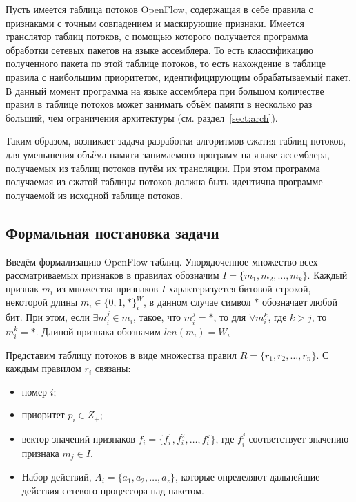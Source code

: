 \documentclass[oneside,final,12pt]{extarticle}
\begin{document}
    Пусть имеется таблица потоков OpenFlow, содержащая в себе правила с признаками с 
    точным совпадением и маскирующие признаки. Имеется транслятор таблиц потоков, с помощью которого
    получается программа обработки сетевых пакетов на языке ассемблера. То есть классификацию 
    полученного пакета по этой таблице потоков, то есть нахождение в таблице правила 
    с наибольшим приоритетом, идентифицирующим обрабатываемый пакет. В данный момент
    программа на языке ассемблера при большом количестве правил в таблице потоков может занимать
    объём памяти в несколько раз больший, чем ограничения архитектуры (см. раздел~\ref{sect:arch}).

    Таким образом, возникает задача разработки алгоритмов сжатия таблиц потоков,
    для уменьшения объёма памяти занимаемого программ на языке ассемблера, получаемых из
    таблиц потоков путём их трансляции. При этом программа получаемая из сжатой таблицы потоков 
    должна быть идентична программе получаемой из исходной таблице потоков.

    
    \subsection{Формальная постановка задачи}
        \label{sect:problem}
        Введём формализацию OpenFlow таблиц.
        Упорядоченное множество всех рассматриваемых признаков в правилах обозначим \(I=\{m_1,m_2,\ldots,m_k\}\). 
        Каждый признак \(m_i\) из множества признаков \(I\) характеризуется битовой строкой, некоторой длины \(m_i \in \{0, 1, *\}^W_i\),
        в данном случае символ \(*\) обозначает любой бит. При этом, если \(\exists m_i^j \in m_i\), такое, что 
        \( m_i^j = *\), то для \( \forall m_i^k \), где \(k > j\), то \( m_i^k = *\). Длиной признака обозначим \(len(m_i) = W_i\)

        Представим таблицу потоков в виде множества правил \(R=\{r_1,r_2,\ldots,r_n\}\). С каждым правилом \(r_i\) связаны:
        \begin{itemize}
            \item номер \(i\);
            \item приоритет \(p_i\in Z_+\);
            \item вектор значений признаков \(f_i=\{f_i^1,f_i^2,\ldots,f_i^k\}\), где \(f_i^j\) соответствует значению признака \(m_j\in I\). %
            \item Набор действий, \(A_i = \{a_1, a_2, \ldots, a_z\} \), которые определяют дальнейшие действия сетевого процессора над пакетом.
        \end{itemize}
\end{document}
